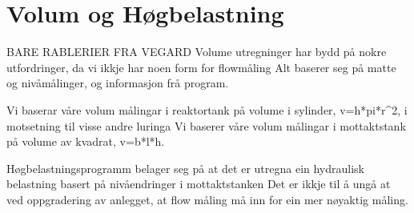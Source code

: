 \chapter{Volum og Høgbelastning}
\thispagestyle{fancy}
BARE RABLERIER FRA VEGARD
Volume utregninger har bydd på nokre utfordringer, da vi ikkje har noen form for flowmåling
Alt baserer seg på matte og nivåmålinger, og informasjon frå program.

Vi baserar våre volum målingar i reaktortank på volume i sylinder, v=h*pi*r^2, i motsetning til visse andre luringa
Vi baserer våre volum målingar i mottaktstank på volume av kvadrat, v=b*l*h.

Høgbelastningsprogramm belager seg på at det er utregna ein hydraulisk belastning basert på nivåendringer i mottaktstanken
Det er ikkje til å ungå at ved oppgradering av anlegget, at flow måling må inn for ein mer nøyaktig måling.